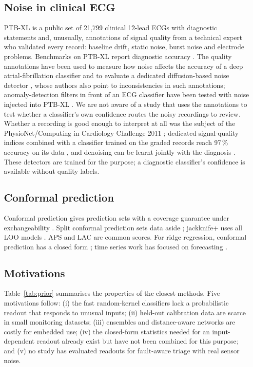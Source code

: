 \documentclass[preprint,12pt,authoryear]{elsarticle}
\begin{document}
\subsection{Noise in clinical ECG}
PTB-XL \citep{wagner2020ptbxl} is a public set of 21{,}799 clinical 12-lead ECGs with diagnostic statements and, unusually, annotations of signal quality from a technical expert who validated every record: baseline drift, static noise, burst noise and electrode problems. Benchmarks on PTB-XL report diagnostic accuracy \citep{strodthoff2021ptbxl}. The quality annotations have been used to measure how noise affects the accuracy of a deep atrial-fibrillation classifier \citep{bender2023noise} and to evaluate a dedicated diffusion-based noise detector \citep{han2025diffusion}, whose authors also point to inconsistencies in such annotations; anomaly-detection filters in front of an ECG classifier have been tested with noise injected into PTB-XL \citep{ibrahim2025uad}. We are not aware of a study that uses the annotations to test whether a classifier's own confidence routes the noisy recordings to review. Whether a recording is good enough to interpret at all was the subject of the PhysioNet/Computing in Cardiology Challenge 2011 \citep{silva2011challenge}; dedicated signal-quality indices combined with a classifier trained on the graded records reach 97\,\% accuracy on its data \citep{clifford2012sqi}, and denoising can be learnt jointly with the diagnosis \citep{wang2026wearable}. These detectors are trained for the purpose; a diagnostic classifier's confidence is available without quality labels.

\subsection{Conformal prediction}
Conformal prediction gives prediction sets with a coverage guarantee under exchangeability \citep{angelopoulos2023,vovk2022}. Split conformal prediction sets data aside \citep{lei2018}; jackknife+ uses all LOO models \citep{barber2021}. APS \citep{angelopoulos2021raps,romano2020} and LAC \citep{sadinle2019} are common scores. For ridge regression, conformal prediction has a closed form \citep{burnaev2014,nouretdinov2001}; time series work has focused on forecasting \citep{xu2023}.

\subsection{Motivations}\label{sec:motivations}
Table~\ref{tab:prior} summarises the properties of the closest methods. Five motivations follow: (i) the fast random-kernel classifiers lack a probabilistic readout that responds to unusual inputs; (ii) held-out calibration data are scarce in small monitoring datasets; (iii) ensembles and distance-aware networks are costly for embedded use; (iv) the closed-form statistics needed for an input-dependent readout already exist but have not been combined for this purpose; and (v) no study has evaluated readouts for fault-aware triage with real sensor noise.
\end{document}

